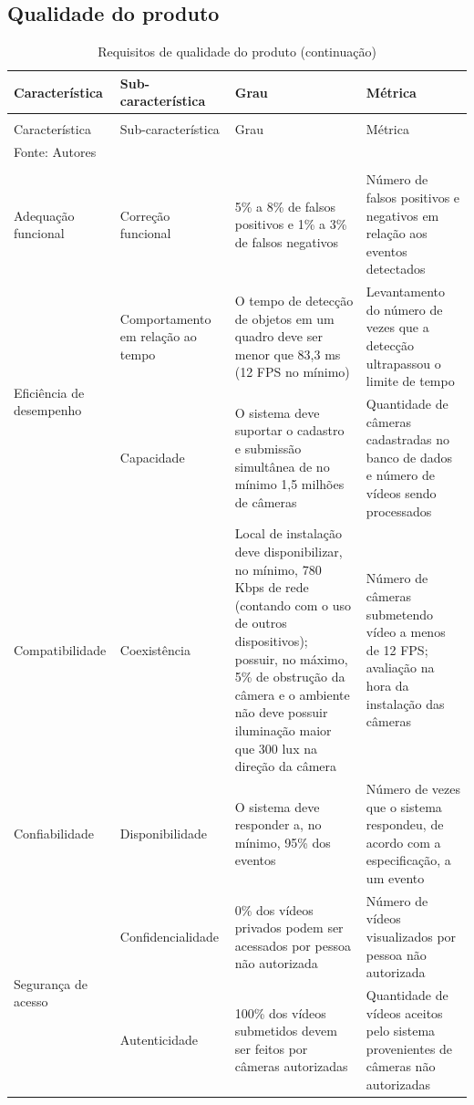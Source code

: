 \documentclass[]{politex}
\begin{document}
\subsection{Qualidade do produto}
\begin{center}
\begin{longtable}{m{3cm} | m{4cm} | m{4cm} | m{4cm}} 
\caption{\label{tab:qualidade_produto}Requisitos de qualidade do produto}\\
\hline\hline
Característica & Sub-característica & Grau & Métrica \\
\hline
\endfirsthead
\caption[]{Requisitos de qualidade do produto (continuação)} \\
\hline
Característica & Sub-característica & Grau & Métrica \\
\hline
\endhead
\hline\hline
\multicolumn{4}{l}{Fonte: Autores} \\
\endlastfoot
\hline
\multicolumn{4}{r}{\footnotesize{}continua na próxima página} \\
\endfoot
 
Adequação funcional & Correção funcional & 5\% a 8\% de falsos positivos e 1\% a 3\% de falsos negativos & Número de falsos positivos e negativos em relação aos eventos detectados\\
\hline

\multirow{2}{3cm}{Eficiência de desempenho} & Comportamento em relação ao tempo & O tempo de detecção de objetos em um quadro deve ser menor que 83,3 ms (12 FPS no mínimo) & Levantamento do número de vezes que a detecção ultrapassou o limite de tempo \\ \cline{2-4}
& Capacidade & O sistema deve suportar o cadastro e submissão simultânea de no mínimo 1,5 milhões de câmeras & Quantidade de câmeras cadastradas no banco de dados e número de vídeos sendo processados \\
\hline

Compatibilidade & Coexistência & Local de instalação deve disponibilizar, no mínimo, 780 Kbps de rede (contando com o uso de outros dispositivos); possuir, no máximo, 5\% de obstrução da câmera e o ambiente não deve possuir iluminação maior que 300 lux na direção da câmera & Número de câmeras submetendo vídeo a menos de 12 FPS; avaliação na hora da instalação das câmeras \\
\hline

Confiabilidade & Disponibilidade & O sistema deve responder a, no mínimo, 95\% dos eventos & Número de vezes que o sistema respondeu, de acordo com a especificação, a um evento \\
\hline

\multirow{2}{3cm}{Segurança de acesso} & Confidencialidade & 0\% dos vídeos privados podem ser acessados por pessoa não autorizada & Número de vídeos visualizados por pessoa não autorizada \\ \cline{2-4}
& Autenticidade & 100\% dos vídeos submetidos devem ser feitos por câmeras autorizadas & Quantidade de vídeos aceitos pelo sistema provenientes de câmeras não autorizadas \\
\end{longtable}
\end{center}
\end{document}
